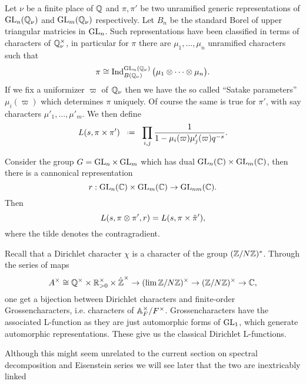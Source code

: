 \begin{example}
	Let \(\nu\) be a finite place of \(\Q\) and \(\pi, \pi'\) be two unramified generic representations of \(\GL_n(\Q_\nu)\) and \(\GL_m(\Q_\nu)\) respectively. Let \(B_n\) be the standard Borel of upper triangular matricies in \(\operatorname{GL}_n\). Such representations have been classified 
	in terms of characters of \(\Q^\times_\nu\), in particular for \(\pi\) there are \(\mu_1, ..., \mu_n\) unramified characters such that 
	\[\pi \cong \Ind_{B(\Q_\nu)}^{\GL_n(\Q_\nu)} \big(\mu_1 \tensor \cdots \tensor \mu_n\big).\]
	If we fix a uniformizer \(\varpi\) of \(\Q_\nu\) then we have the so called ``Satake parameters'' \(\mu_i(\varpi)\) which determines \(\pi\) uniquely. Of course the same is true for \(\pi'\), with say characters \(\mu'_1, ..., \mu'_m\). We then define
	\[L(s, \pi\times \pi') \defeq \prod_{i,j} \frac{1}{1-\mu_i(\varpi)\mu'_j(\varpi)q^{-s}}.\]
	
	Consider the group \(G = \operatorname{GL}_n\times \operatorname{GL}_m\) which has dual \(\GL_n(\C) \times \GL_m(\C)\), then there is a cannonical representation 
	\[r:\GL_n(\C) \times \GL_m(\C) \to \GL_{nm}(\C). \]
	Then 
	\[L(s, \pi\otimes \pi', r) = L(s, \pi \times \tilde{\pi}'),\]
	where the tilde denotes the contragradient.
\end{example}

\begin{example}
	Recall that a Dirichlet character \(\chi\) is a character of the group \((\Z/N\Z)^*\). Through the series of maps 
	\[A^\times \cong \Q^\times \times \R_{>0}^\times \times \hat{\Z}^\times \to (\lim \Z/N\Z)^\times \to (\Z/N\Z)^\times \to \C,\]
	one get a bijection between Dirichlet characters and finite-order Grossencharacters, i.e. characters of \(\A_F^\times/F^\times\).
	Grossencharacters have the associated L-function as they are just automorphic forms of \(\operatorname{GL}_1\), which generate automorphic representations. These give us the classical Dirichlet L-functions.
\end{example}
Although this might seem unrelated to the current section on spectral decomposition and Eisenstein series we will see later that the two are inextricably linked
